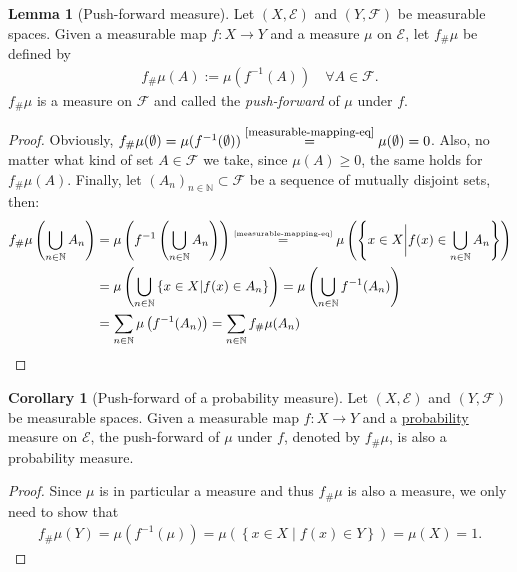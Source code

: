 \documentclass[12pt, a4paper]{article}
\numberwithin{equation}{section}
\theoremstyle{definition}
\theoremstyle{definition}
\newtheorem{lemma}[thm]{Lemma} %
\newtheorem{corollary}[thm]{Corollary}
\begin{document}
	\begin{lemma}[Push-forward measure]\label{push-forward-measure}
		Let $(X, \mathcal E)$ and $(Y, \mathcal F)$ be measurable spaces. Given a measurable map $f: X\rightarrow Y$ and a measure $\mu$ on $\mathcal E$, let $f_{\#}\mu$ be defined by 
		\begin{align}
			f_{\#}\mu(A) := \mu(f^{-1}(A)) \quad \forall A\in \mathcal F. 
		\end{align}
		$f_{\#}\mu$ is a measure on $\mathcal F$ and called the \textit{push-forward} of $\mu$ under $f$. 
	\end{lemma}

	\begin{proof}
		Obviously, $f_{\#}\mu(\emptyset) = \mu(f^{-1}(\emptyset)) \overset{\footnotesize\eqref{measurable-mapping-eq}}{=} \mu(\emptyset) = 0$. Also, no matter what kind of set $A\in \mathcal F$ we take, since $\mu(A) \geq 0$, the same holds for $f_{\#}\mu(A)$. Finally, let $(A_n)_{n\in\mathbb{N}} \subset \mathcal F$ be a sequence of mutually disjoint sets, then: 
		\begin{align*}
			f_{\#}\mu\left(\bigcup_{n\in\mathbb N}A_n \right) &= 
			\mu\left(f^{-1}\left(\bigcup_{n\in\mathbb N}A_n\right) \right) \overset{\tiny\eqref{measurable-mapping-eq}}{=}
			\mu\left( \left\{ x\in X \bigg\vert f(x) \in  \bigcup_{n\in\mathbb N}A_n \right\}\right) 
						\\ &= 		
			\mu\left( \bigcup_{n\in\mathbb N}\left\{ x\in X \vert f(x)\in A_n \right\} \right) 
						=
			\mu\left( \bigcup_{n\in\mathbb{N}}f^{-1}(A_n) \right)
						\\ &= \sum_{n\in\mathbb N}\mu\left(f^{-1}(A_n)\right) = \sum_{n\in\mathbb{N}}f_{\#}\mu(A_n) 
		\end{align*}
	\end{proof}
	
	\begin{corollary}[Push-forward of a probability measure]
		Let $(X, \mathcal E)$ and $(Y, \mathcal F)$	be measurable spaces. Given a measurable map $f: X\rightarrow Y$ and a \underline{probability} measure on $\mathcal E$, the push-forward of $\mu$ under $f$, denoted by $f_{\#}\mu$, is also a probability measure. 
	\end{corollary}

	\begin{proof}
		Since $\mu$ is in particular a measure and thus $f_{\#}\mu$ is also a measure, we only need to show that  
		\begin{align}
			f_{\#}\mu(Y) = \mu\left(f^{-1}\left(\mu\right)\right) = \mu\left(\left\{ x\in X \mid f(x)\in Y  \right\}\right) = \mu(X) = 1. 
		\end{align}
	\end{proof} 
	
\end{document}
